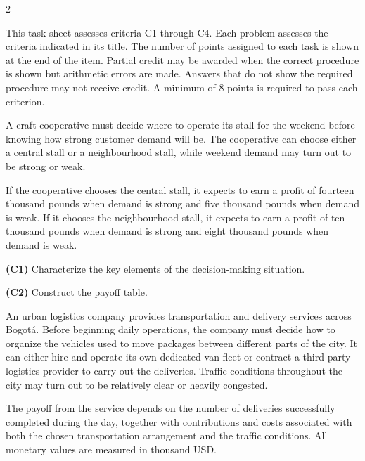	\begin{multicols}{2}
		
		This task sheet assesses criteria C1 through C4. Each problem assesses the criteria indicated in its title. The number of points assigned to each task is shown at the end of the item. Partial credit may be awarded when the correct procedure is shown but arithmetic errors are made. Answers that do not show the required procedure may not receive credit. A minimum of 8 points is required to pass each criterion.
		

		A craft cooperative must decide where to operate its stall for the weekend before knowing how strong customer demand will be. The cooperative can choose either a central stall or a neighbourhood stall, while weekend demand may turn out to be strong or weak.
		
		If the cooperative chooses the central stall, it expects to earn a profit of fourteen thousand pounds when demand is strong and five thousand pounds when demand is weak. If it chooses the neighbourhood stall, it expects to earn a profit of ten thousand pounds when demand is strong and eight thousand pounds when demand is weak.
		
		\begin{alphenum}
			\item \textbf{(C1)} Characterize the key elements of the decision-making situation. 
			\item \textbf{(C2)} Construct the payoff table. 
		\end{alphenum}


		An urban logistics company provides transportation and delivery services across Bogotá. Before beginning daily operations, the company must decide how to organize the vehicles used to move packages between different parts of the city. It can either hire and operate its own dedicated van fleet or contract a third-party logistics provider to carry out the deliveries. Traffic conditions throughout the city may turn out to be relatively clear or heavily congested.
		
		The payoff from the service depends on the number of deliveries successfully completed during the day, together with contributions and costs associated with both the chosen transportation arrangement and the traffic conditions. All monetary values are measured in thousand USD.
		

\end{multicols}
